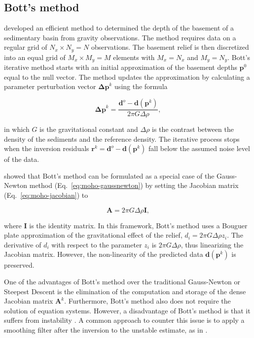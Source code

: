 \subsection{Bott's method}

\citet{bott1960} developed an efficient method to determined the depth of the
basement of a sedimentary basin from gravity observations.
The method requires data on a regular grid of $N_x \times N_y = N$
observations.
The basement relief is then discretized into an equal grid of $M_x \times
M_y = M$ elements with $M_x = N_x$ and $M_y = N_y$.
Bott's iterative method starts with an initial approximation of the basement
depths $\mathbf{p}^0$ equal to the null vector.
The method updates the approximation by calculating a parameter perturbation
vector $\mathbf{\Delta p}^k$ using the formula

\begin{equation}
    \mathbf{\Delta p}^k =
        \dfrac{\mathbf{d}^o - \mathbf{d}(\mathbf{p}^k)}{2\pi G \Delta \rho},
    \label{eq:moho-bott}
\end{equation}

\noindent
in which $G$ is the gravitational constant and $\Delta \rho$ is the
contrast between the density of the sediments and the reference density.
The iterative process stops when the inversion residuals
$\mathbf{r}^k = \mathbf{d}^o - \mathbf{d}(\mathbf{p}^k)$ fall below the assumed noise level
of the data.

\citet{silva2014} showed that Bott's method can be formulated as
a special case of the Gauss-Newton method (Eq.~\ref{eq:moho-gaussnewton})
by setting the Jacobian matrix (Eq.~\ref{eq:moho-jacobian}) to

\begin{equation}
    \mathbf{A} = 2\pi G \Delta \rho \mathbf{I},
    \label{eq:moho-bott-gaussnewton}
\end{equation}

\noindent
where $\mathbf{I}$ is the identity matrix.
In this framework,
Bott's method uses a Bouguer plate approximation of the gravitational effect of
the relief, $d_i = 2\pi G \Delta\rho z_i$.
The derivative of $d_i$ with respect to the parameter $z_i$ is
$2\pi G \Delta \rho$, thus linearizing the Jacobian matrix.
However, the non-linearity of the predicted data $\mathbf{d}(\mathbf{p}^k)$ is
preserved.

One of the advantages of Bott's method over the traditional Gauss-Newton or
Steepest Descent is the elimination of the computation and storage of the dense
Jacobian matrix $\mathbf{A}^k$.
Furthermore, Bott's method also does not require the solution of equation
systems.
However, a disadvantage of Bott's method is that it suffers from instability
\citep{silva2014}.
A common approach to counter this issue is to apply a smoothing filter after
the inversion to the unstable estimate, as in \citet{silva2014}.



